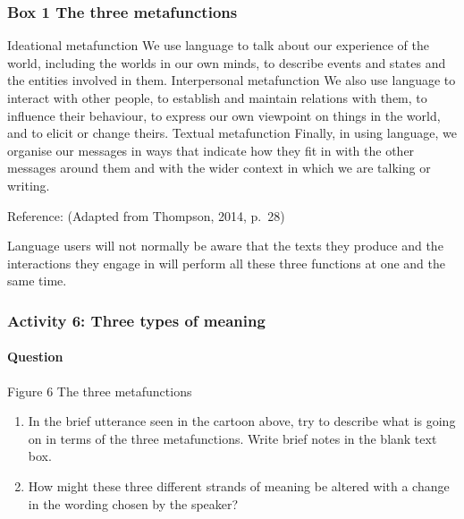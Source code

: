 \documentclass[letterpaper,10pt,english]{sphinxmanual}
\let\sphinxpxdimen\pdfpxdimen\else\newdimen\sphinxpxdimen
\begin{document}
\subsubsection{Box 1 The three metafunctions}
\label{\detokenize{content/session_00/Part_00_02:Box-1-The-three-metafunctions}}
Ideational metafunction We use language to talk about our experience of the world, including the worlds in our own minds, to describe events and states and the entities involved in them. Interpersonal metafunction We also use language to interact with other people, to establish and maintain relations with them, to influence their behaviour, to express our own viewpoint on things in the world, and to elicit or change theirs. Textual metafunction Finally, in using language, we organise our
messages in ways that indicate how they fit in with the other messages around them and with the wider context in which we are talking or writing.

Reference: (Adapted from Thompson, 2014, p. 28)

Language users will not normally be aware that the texts they produce and the interactions they engage in will perform all these three functions at one and the same time.


\subsubsection{Activity 6: Three types of meaning}
\label{\detokenize{content/session_00/Part_00_02:Activity-6:-Three-types-of-meaning}}


\paragraph{Question}
\label{\detokenize{content/session_00/Part_00_02:Question}}
\sphinxincludegraphics[width=339\sphinxpxdimen,height=377\sphinxpxdimen]{{e304_bk1_ch4_fig007}.jpg}

Figure 6 The three metafunctions
\begin{enumerate}
%
\item {} 
In the brief utterance seen in the cartoon above, try to describe what is going on in terms of the three metafunctions. Write brief notes in the blank text box.

\item {} 
How might these three different strands of meaning be altered with a change in the wording chosen by the speaker?

\end{enumerate}
\end{document}

